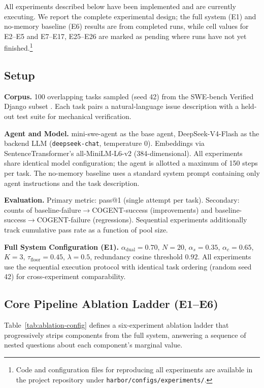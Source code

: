 \documentclass[letterpaper]{article} %
\begin{document}
All experiments described below have been implemented and are currently executing. We report the complete experimental design; the full system (E1) and no-memory baseline (E6) results are from completed runs, while cell values for E2--E5 and E7--E17, E25--E26 are marked as pending where runs have not yet finished.\footnote{Code and configuration files for reproducing all experiments are available in the project repository under \texttt{harbor/configs/experiments/}.}

\subsection{Setup}

\textbf{Corpus.} 100 overlapping tasks sampled (seed 42) from the SWE-bench Verified Django subset \cite{swe-bench}. Each task pairs a natural-language issue description with a held-out test suite for mechanical verification.

\textbf{Agent and Model.} mini-swe-agent as the base agent, DeepSeek-V4-Flash as the backend LLM (\texttt{deepseek-chat}, temperature 0). Embeddings via SentenceTransformer's all-MiniLM-L6-v2 (384-dimensional). All experiments share identical model configuration; the agent is allotted a maximum of 150 steps per task. The no-memory baseline uses a standard system prompt containing only agent instructions and the task description.

\textbf{Evaluation.} Primary metric: pass@1 (single attempt per task). Secondary: counts of baseline-failure$\rightarrow$COGENT-success (improvements) and baseline-success$\rightarrow$COGENT-failure (regressions). Sequential experiments additionally track cumulative pass rate as a function of pool size.

\textbf{Full System Configuration (E1).} $\alpha_{\text{dual}} = 0.70$, $N = 20$, $\alpha_s = 0.35$, $\alpha_c = 0.65$, $K = 3$, $\tau_{\text{floor}} = 0.45$, $\lambda = 0.5$, redundancy cosine threshold $0.92$. All experiments use the sequential execution protocol with identical task ordering (random seed 42) for cross-experiment comparability.

\subsection{Core Pipeline Ablation Ladder (E1--E6)}

Table~\ref{tab:ablation-config} defines a six-experiment ablation ladder that progressively strips components from the full system, answering a sequence of nested questions about each component's marginal value.
\end{document}
